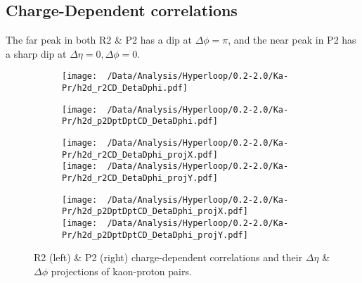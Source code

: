\documentclass[12pt,a4paper,twoside]{report}
\begin{document}
\subsection{Charge-Dependent correlations}
The far peak in both R2 \&  P2 has a dip at $\Delta\phi=\pi$, and the near peak in P2 has a sharp dip at $\Delta\eta=0,\Delta\phi=0$.
\begin{figure}[H]
	\begin{subfigure}{0.49\linewidth}
		\texttt{[image: ~/Data/Analysis/Hyperloop/0.2-2.0/Ka-Pr/h2d\_r2CD\_DetaDphi.pdf]}\\
	\end{subfigure}
	\begin{subfigure}{0.49\linewidth}
		\texttt{[image: ~/Data/Analysis/Hyperloop/0.2-2.0/Ka-Pr/h2d\_p2DptDptCD\_DetaDphi.pdf]}\\
	\end{subfigure}
\end{figure}
\begin{figure}[H]
	\ContinuedFloat
	\begin{subfigure}{0.49\linewidth}
		\texttt{[image: ~/Data/Analysis/Hyperloop/0.2-2.0/Ka-Pr/h2d\_r2CD\_DetaDphi\_projX.pdf]}\\
		\texttt{[image: ~/Data/Analysis/Hyperloop/0.2-2.0/Ka-Pr/h2d\_r2CD\_DetaDphi\_projY.pdf]}\\
	\end{subfigure}
	\begin{subfigure}{0.49\linewidth}
		\texttt{[image: ~/Data/Analysis/Hyperloop/0.2-2.0/Ka-Pr/h2d\_p2DptDptCD\_DetaDphi\_projX.pdf]}\\
		\texttt{[image: ~/Data/Analysis/Hyperloop/0.2-2.0/Ka-Pr/h2d\_p2DptDptCD\_DetaDphi\_projY.pdf]}\\
	\end{subfigure}
	\caption{R2 (left) \& P2 (right) charge-dependent correlations and their $\Delta\eta$ \& $\Delta\phi$ projections of kaon-proton pairs.}
\end{figure}
\end{document}
